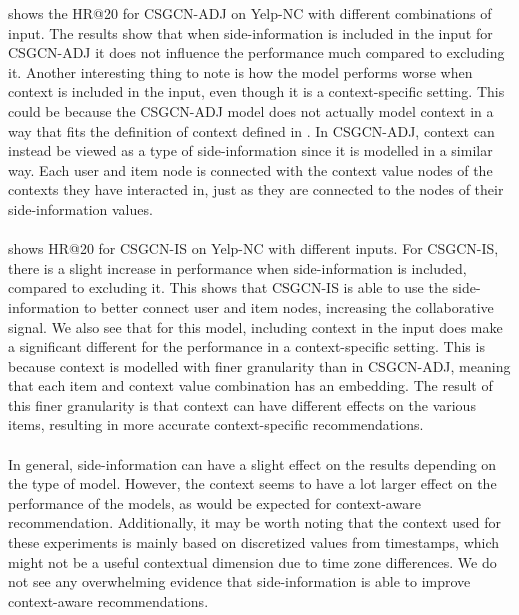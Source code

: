  shows the HR@20 for CSGCN-ADJ on Yelp-NC with different combinations of input. 
The results show that when side-information is included in the input for CSGCN-ADJ it does not influence the performance much compared to excluding it.
Another interesting thing to note is how the model performs worse when context is included in the input, even though it is a context-specific setting.
This could be because the CSGCN-ADJ model does not actually model context in a way that fits the definition of context defined in .
In CSGCN-ADJ, context can instead be viewed as a type of side-information since it is modelled in a similar way.
Each user and item node is connected with the context value nodes of the contexts they have interacted in, just as they are connected to the nodes of their side-information values.
\\\\
 shows HR@20 for CSGCN-IS on Yelp-NC with different inputs.
For CSGCN-IS, there is a slight increase in performance when side-information is included, compared to excluding it.
This shows that CSGCN-IS is able to use the side-information to better connect user and item nodes, increasing the collaborative signal.
We also see that for this model, including context in the input does make a significant different for the performance in a context-specific setting.
This is because context is modelled with finer granularity than in CSGCN-ADJ, meaning that each item and context value combination has an embedding.
The result of this finer granularity is that context can have different effects on the various items, resulting in more accurate context-specific recommendations.
\\\\
In general, side-information can have a slight effect on the results depending on the type of model.
However, the context seems to have a lot larger effect on the performance of the models, as would be expected for context-aware recommendation.
Additionally, it may be worth noting that the context used for these experiments is mainly based on discretized values from timestamps, which might not be a useful contextual dimension due to time zone differences.
We do not see any overwhelming evidence that side-information is able to improve context-aware recommendations.
